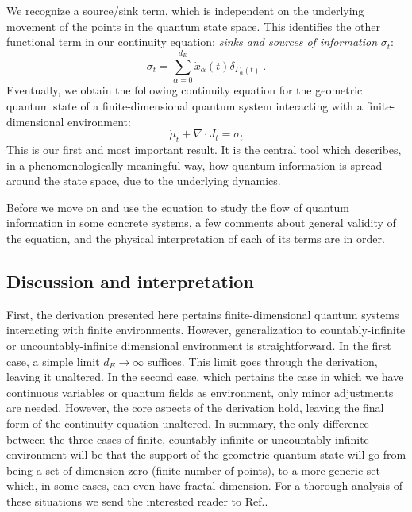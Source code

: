 \documentclass[draft,nofootinbib,pre,twocolumn,showpacs,showkeys,preprintnumbers,floatfix]{revtex4-1}
\newcommand{\1}{\mathbbm{1}}
\begin{document}
We recognize a source/sink term, which is independent on the underlying movement of
the points in the quantum state space. This identifies the other functional term in our continuity 
equation: \emph{sinks and sources of information} $\sigma_t$:
\begin{equation}
\sigma_t = \sum_{\alpha=0}^{d_E} \dot{x}_\alpha(t) \delta_{\Gamma_\alpha(t)}~.\label{eq:sigma}
\end{equation}
Eventually, we obtain the following continuity equation for the geometric quantum state of a finite-dimensional
quantum system interacting with a finite-dimensional environment:
\begin{equation}
\dot{\mu}_t + \nabla \cdot J_t = \sigma_t\label{eq:continuity}
\end{equation}
This is our first and most important result. It is the central tool which describes, in a phenomenologically
meaningful way, how quantum information is spread around the state space, due to the underlying dynamics.

Before we move on and use the equation to study the flow of quantum information in some concrete
systems, a few comments about general validity of the equation, and the physical interpretation of each of
its terms are in order.



\subsection*{Discussion and interpretation}

First, the derivation presented here pertains finite-dimensional quantum systems interacting with 
finite environments. However, generalization to countably-infinite or uncountably-infinite dimensional
environment is straightforward. In the first case, a simple limit $d_E \to \infty$ suffices. This limit goes
through the derivation, leaving it unaltered. In the second case, which pertains the case in which we 
have continuous variables or quantum fields as environment, only minor adjustments are needed.
However, the core aspects of the derivation hold, leaving the final form of the continuity equation
unaltered. In summary, the only difference between the three cases of finite, countably-infinite or uncountably-infinite
environment will be that the support of the geometric quantum state will go from being a set of dimension zero (finite number
of points), to a more generic set which, in some cases, can even have fractal dimension. For a thorough analysis
of these situations we send the interested reader to Ref.\cite{Anza22}.
\end{document}

